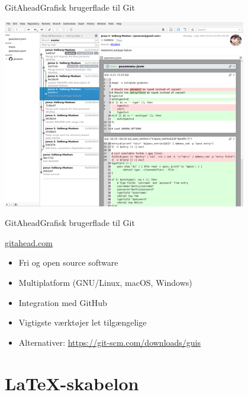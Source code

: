 \documentclass[10pt]{beamer}
\begin{document}
\begin{frame}{GitAhead}{Grafisk brugerflade til Git}
  \begin{center}
    \includegraphics[width=0.8\textwidth]{img/gitahead}
  \end{center}
\end{frame}

\begin{frame}{GitAhead}{Grafisk brugerflade til Git}
  \begin{block}{\url{gitahead.com}}
    \begin{itemize}
    \item Fri og open source software
    \item Multiplatform (GNU/Linux, macOS, Windows)
    \item Integration med GitHub
    \item Vigtigste værktøjer let tilgængelige
    \item Alternativer: \url{https://git-scm.com/downloads/guis}
    \end{itemize}
  \end{block}
\end{frame}

\section{\LaTeX-skabelon}
\label{sec:template}
\end{document}
